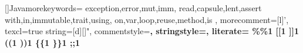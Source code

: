 \ifdefined\block%
  \renewcommand\block{\V{\cal{B}}}
\else%
  \newcommand\block{\V{\cal{B}}}
\fi%


\newcommand\labelMeta{\raisebox{0.2ex}{\scriptsize{\textbf{META}}}}

\newcommand\ImplementationsDefinitions[3]{%
  #1;#2\,%
  \Aux{are impl;decl of }#3%
  }

\newcommand{\vT}{\V{'\!}}
\newcommand{\vi}{\V{i}}
\newcommand{\vj}{\V{j}}
\newcommand{\vn}{\V{n}}
\newcommand{\vk}{\V{k}}
\newcommand{\vz}{\V{0}}
\newcommand{\vI}{\V{1}}
\newcommand{\vII}{\V{2}}
\newcommand{\vIII}{\V{3}}
\newcommand{\vIIII}{\V{4}}






[]{Java}{morekeywords={%
  exception,error,mut,imm,
  read,capsule,lent,assert
  with,in,immutable,trait,using,
  on,var,loop,reuse,method,is
  },
 morecomment=[l]',
 texcl=true
 string=[d][\ttfamily]",
commentstyle=\ttfamily\bfseries\color{darkBlue},
 stringstyle=\color{red}\ttfamily,
 literate=
                 {\%}{{\mbox{\textbf{\%}}}}1
                 {[}{{\textbf{[}}}1
                 {]}{{\textbf{]}}}1
                 {(}{{\textbf{(}}}1
                 {)}{{\textbf{)}}}1
                 {\{}{{\textbf{\{}}}1
                 {\}}{{\textbf{\}}}}1
                 {;}{{\textbf{;}}}1
 }

\newcommand{\Comment}[1]{%
  \texttt{\textbf{\color{darkBlue}{//#1}}}%
}
\newcommand{\MComment}[1]{%
  \texttt{\textbf{\color{darkBlue}{/*#1*/}}}%
}
\newcommand{\ReuseUrl}[1]{%
  \scalebox{0.90}[1]{\textit{\color{darkRed}#1}}%
  }

